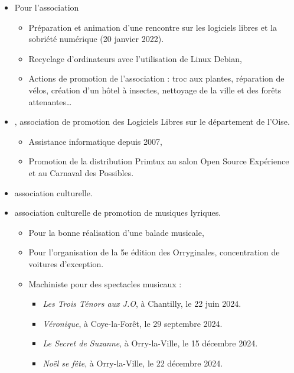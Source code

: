 \begin{itemize}
\begin{itemize}
        \end{itemize}
    \item{Pour l'association }
        \begin{itemize}
            \item{Préparation et animation d'une rencontre sur les logiciels libres et la sobriété numérique (20 janvier 2022).}
            \item{Recyclage d'ordinateurs avec l'utilisation de Linux Debian,}
            \item{Actions de promotion de l'association : troc aux plantes, réparation de vélos, création d'un hôtel à insectes, nettoyage de la ville et des forêts attenantes\dots}
        \end{itemize}
    \item{, association de promotion des Logiciels Libres sur le département de l'Oise.}
        \begin{itemize}
            \item{Assistance informatique depuis 2007,}
            \item{Promotion de la distribution Primtux au salon Open Source Expérience et au Carnaval des Possibles.}
        \end{itemize}
    \item{ association culturelle.}
    \item{ association culturelle de promotion de musiques lyriques.}
        \begin{itemize}
            \item{Pour la bonne réalisation d'une balade musicale,}
            \item{Pour l'organisation de la 5e édition des Orryginales, concentration de voitures d'exception.}
            \item{Machiniste pour des spectacles musicaux :}
                \begin{itemize}
                    \item{\textit{Les Trois Ténors aux J.O}, à Chantilly, le 22 juin 2024.}
                    \item{\textit{Véronique}, à Coye-la-Forêt, le 29 septembre 2024.}
                    \item{\textit{Le Secret de Suzanne}, à Orry-la-Ville, le 15 décembre 2024.}
                    \item{\textit{Noël se fête}, à Orry-la-Ville, le 22 décembre 2024.}

\end{itemize}
\end{itemize}
\end{itemize}
